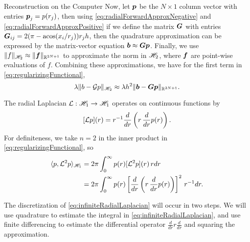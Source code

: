 \begin{chapter}{Reconstruction on the Computer}
Now, let $\mbox{\boldmath$p$}$ be the $N\times 1$ column vector with entries $\mbox{\boldmath$p$}_j = p(r_j)$, then using \eqref{eq:radialForwardApproxNegative} and \eqref{eq:radialForwardApproxPositive} if we define the matrix $\mbox{\boldmath$G$}$ with entries $\mbox{\boldmath$G$}_{ij} = 2(\pi - \operatorname*{acos}(x_i/r_j)) r_j h$, then the quadrature approximation can be expressed by the matrix-vector equation $\mbox{\boldmath$b$} \approx \mbox{\boldmath$G$} \mbox{\boldmath$p$}$.
Finally, we use $\|f\|_{\mathscr H_2} \approx \|\mbox{\boldmath$f$}\|_{\mathbb R^{2N+1}}$ to approximate the norm in $\mathscr H_2$, where $\mbox{\boldmath$f$}$ are point-wise evaluations of $f$.
Combining these approximations, we have for the first term in \eqref{eq:regularizingFunctional},
\begin{equation}
  \lambda \|b - \mathcal G p\|_{\mathscr H_2} \approx \lambda h^2 \|\mbox{\boldmath$b$} - \mbox{\boldmath$G$} \mbox{\boldmath$p$}\|_{\mathbb R^{2N+1}}.
\end{equation}

The radial Laplacian $\mathcal L: \mathscr H_1 \to \mathscr H_1$ operates on continuous functions by
\begin{equation} \label{eq:infiniteRadialLaplacian}
  [\mathcal L p](r) = r^{-1}\frac{d}{dr}\left(r \,\frac{d}{dr}p(r)\right). 
\end{equation}
For definiteness, we take $n=2$ in the inner product in \eqref{eq:regularizingFunctional}, so
\begin{align} 
  \langle p, \mathcal L^2 p \rangle_{\mathscr H_1}
  &= 2\pi\int_0^\infty p(r) [\mathcal L^2 p](r) \, rdr \nonumber\\
  &= 2\pi\int_0^\infty p(r) \left[\frac{d}{dr}\left(r \,\frac{d}{dr}p(r)\right)\right]^2 \, r^{-1}dr.
  \label{eq:infiteRadialInnerProduct}
\end{align}

The discretization of \eqref{eq:infiniteRadialLaplacian} will occur in two steps. 
We will use quadrature to estimate the integral in \eqref{eq:infiniteRadialLaplacian}, and use finite differencing to estimate the differential operator $\frac d{dr} r \frac d{dr}$ and squaring the approximation.


\end{chapter}
